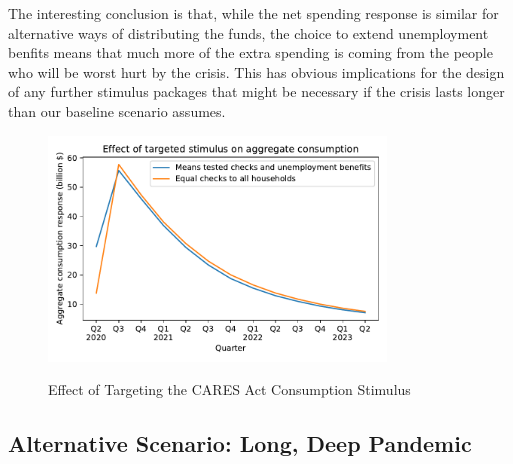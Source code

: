 \documentclass[titlepage]{\econtex}
\begin{document}
The interesting conclusion is that, while the net spending response is similar for alternative ways of distributing the funds, the choice to extend unemployment benfits means that much more of the extra spending is coming from the people who will be worst hurt by the crisis.  This has obvious implications for the design of any further stimulus packages that might be necessary if the crisis lasts longer than our baseline scenario assumes.

\begin{figure}
  \centering
  \caption{Effect of Targeting the CARES Act Consumption Stimulus}
  \label{EffectTargeting}
  { \includegraphics[width=0.8\textwidth]{./Figures/EffectTargeting}}
\end{figure}


\subsection{Alternative Scenario: Long, Deep Pandemic} \label{sec:longPandemic}
\end{document}
